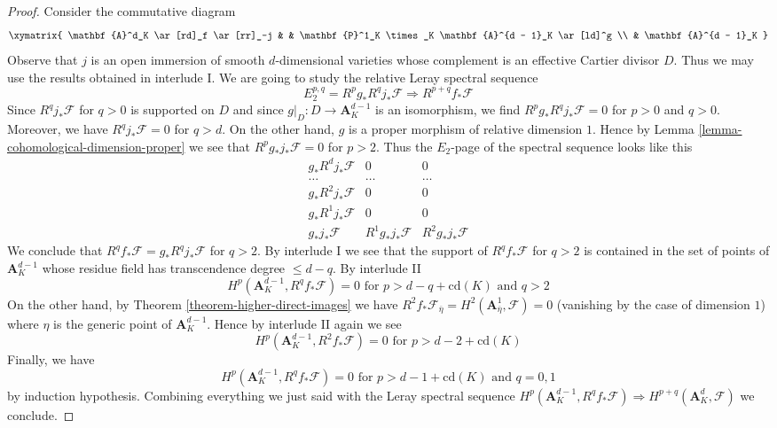 \begin{proof}
\medskip\noindent
Consider the commutative diagram
$$
\xymatrix{
\mathbf{A}^d_K \ar[rd]_f \ar[rr]_-j & &
\mathbf{P}^1_K \times_K \mathbf{A}^{d - 1}_K \ar[ld]^g \\
& \mathbf{A}^{d - 1}_K
}
$$
Observe that $j$ is an open immersion of smooth $d$-dimensional
varieties whose complement is an effective Cartier divisor $D$. Thus
we may use the results obtained in interlude I.
We are going to study the relative Leray spectral sequence
$$
E_2^{p, q} = R^pg_*R^qj_*\mathcal{F} \Rightarrow R^{p + q}f_*\mathcal{F}
$$
Since $R^qj_*\mathcal{F}$ for $q > 0$ is supported on $D$ and since
$g|_D : D \to \mathbf{A}^{d - 1}_K$ is an isomorphism, we find
$R^pg_*R^qj_*\mathcal{F} = 0$ for $p > 0$ and $q > 0$. Moreover, we have
$R^qj_*\mathcal{F} = 0$ for $q > d$. On the other hand, $g$ is a
proper morphism of relative dimension $1$. Hence by
Lemma \ref{lemma-cohomological-dimension-proper}
we see that $R^pg_*j_*\mathcal{F} = 0$ for $p > 2$. Thus the $E_2$-page
of the spectral sequence looks like this
$$
\begin{matrix}
g_*R^dj_*\mathcal{F} & 0 & 0 \\
\ldots & \ldots & \ldots \\
g_*R^2j_*\mathcal{F} & 0 & 0 \\
g_*R^1j_*\mathcal{F} & 0 & 0 \\
g_*j_*\mathcal{F} & R^1g_*j_*\mathcal{F} & R^2g_*j_*\mathcal{F}
\end{matrix}
$$
We conclude that $R^qf_*\mathcal{F} = g_*R^qj_*\mathcal{F}$ for $q > 2$.
By interlude I we see that the support of $R^qf_*\mathcal{F}$ for $q > 2$
is contained in the set of points of $\mathbf{A}^{d - 1}_K$
whose residue field has transcendence degree $\leq d - q$.
By interlude II
$$
H^p(\mathbf{A}^{d - 1}_K, R^qf_*\mathcal{F}) = 0
\text{ for }p > d - q + \text{cd}(K)\text{ and }q > 2
$$
On the other hand, by Theorem \ref{theorem-higher-direct-images}
we have $R^2f_*\mathcal{F}_{\overline{\eta}} =
H^2(\mathbf{A}^1_{\overline{\eta}}, \mathcal{F}) = 0$
(vanishing by the case of dimension $1$) where $\eta$ is the
generic point of $\mathbf{A}^{d - 1}_K$.
Hence by interlude II again we see
$$
H^p(\mathbf{A}^{d - 1}_K, R^2f_*\mathcal{F}) = 0
\text{ for }p > d - 2 + \text{cd}(K)
$$
Finally, we have
$$
H^p(\mathbf{A}^{d - 1}_K, R^qf_*\mathcal{F}) = 0
\text{ for }p > d - 1 + \text{cd}(K)\text{ and }q = 0, 1
$$
by induction hypothesis. Combining everything we just said
with the Leray spectral sequence
$H^p(\mathbf{A}^{d - 1}_K, R^qf_*\mathcal{F}) \Rightarrow
H^{p + q}(\mathbf{A}^d_K, \mathcal{F})$ we conclude.
\end{proof}

